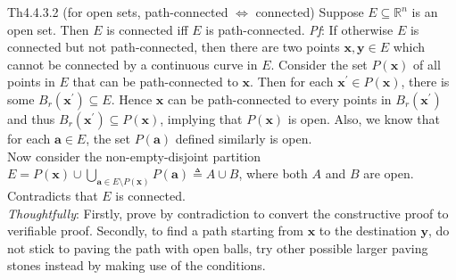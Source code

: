\documentclass{article}
\begin{document}
\begin{Th}{Th4.4.3.2 (for open sets, path-connected $\Leftrightarrow$ connected)}
    Suppose $E\subseteq\mathbb{R}^n$ is an open set. Then $E$ is connected iff $E$ is path-connected.
    \tcblower
    \textit{Pf}: If otherwise $E$ is connected but not path-connected, then there are two points $\pmb{x}, \pmb{y}\in E$ which cannot be connected by a continuous curve in $E$. Consider the set $P(\pmb{x})$ of all points in $E$ that can be path-connected to $\pmb{x}$. Then for each $\pmb{x}^\prime\in P(\pmb{x})$, there is some $B_r(\pmb{x}^\prime)\subseteq E$. Hence $\pmb{x}$ can be path-connected to every points in $B_r(\pmb{x}^\prime)$ and thus $B_r(\pmb{x}^\prime)\subseteq P(\pmb{x})$, implying that $P(\pmb{x})$ is open. Also, we know that for each $\pmb{a}\in E$, the set $P(\pmb{a})$ defined similarly is open. \\
    Now consider the non-empty-disjoint partition $E = P(\pmb{x})\cup \bigcup_{\pmb{a}\in E\setminus P(\pmb{x})}P(\pmb{a})\triangleq A\cup B$, where both $A$ and $B$ are open. Contradicts that $E$ is connected.\\
    \textcolor{P}{\textit{Thoughtfully}: Firstly, prove by contradiction to convert the constructive proof to verifiable proof. Secondly, to find a path starting from $\pmb{x}$ to the destination $\pmb{y}$, do not stick to paving the path with open balls, try other possible larger paving stones instead by making use of the conditions.}
\end{Th}
\end{document}
